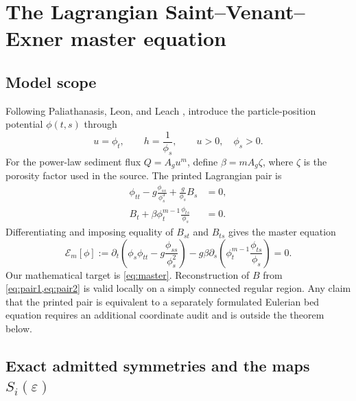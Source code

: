 \documentclass[11pt]{article}
\newcommand{\E}{\mathcal E}
\newcommand{\eps}{\varepsilon}
\begin{document}
\section{The Lagrangian Saint--Venant--Exner master equation}

\subsection{Model scope}

Following Paliathanasis, Leon, and Leach \cite{paliathanasis2026}, introduce the particle-position potential $\phi(t,s)$ through
\begin{equation}
 u=\phi_t,
 \qquad h=\frac{1}{\phi_s},
 \qquad u>0,\quad \phi_s>0.
\end{equation}
For the power-law sediment flux $Q=A_g u^m$, define $\beta=mA_g\zeta$, where $\zeta$ is the porosity factor used in the source.  The printed Lagrangian pair is
\begin{align}
 \phi_{tt}-g\frac{\phi_{ss}}{\phi_s^3}+\frac{g}{\phi_s}B_s&=0,\label{eq:pair1}\\
 B_t+\beta\phi_t^{m-1}\frac{\phi_{ts}}{\phi_s}&=0.\label{eq:pair2}
\end{align}
Differentiating and imposing equality of $B_{st}$ and $B_{ts}$ gives the master equation
\begin{equation}
 \E_m[\phi]
 :=\partial_t\!\left(\phi_s\phi_{tt}-g\frac{\phi_{ss}}{\phi_s^2}\right)
 -g\beta\partial_s\!\left(\phi_t^{m-1}\frac{\phi_{ts}}{\phi_s}\right)=0.
 \label{eq:master}
\end{equation}
Our mathematical target is \cref{eq:master}.  Reconstruction of $B$ from \cref{eq:pair1,eq:pair2} is valid locally on a simply connected regular region.  Any claim that the printed pair is equivalent to a separately formulated Eulerian bed equation requires an additional coordinate audit and is outside the theorem below.

\subsection{Exact admitted symmetries and the maps \texorpdfstring{$S_i(\eps)$}{Si(epsilon)}}
\end{document}
